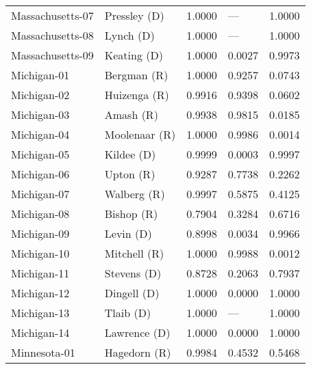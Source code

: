 \begin{longtable}{llrll}
  Massachusetts-07 &        {\color{Blue} Pressley (D)} &       1.0000 &           --- &        1.0000 \\
  Massachusetts-08 &           {\color{Blue} Lynch (D)} &       1.0000 &           --- &        1.0000 \\
  Massachusetts-09 &         {\color{Blue} Keating (D)} &       1.0000 &        0.0027 &        0.9973 \\
       Michigan-01 &          {\color{Red} Bergman (R)} &       1.0000 &        0.9257 &        0.0743 \\
       Michigan-02 &         {\color{Red} Huizenga (R)} &       0.9916 &        0.9398 &        0.0602 \\
       Michigan-03 &            {\color{Red} Amash (R)} &       0.9938 &        0.9815 &        0.0185 \\
       Michigan-04 &        {\color{Red} Moolenaar (R)} &       1.0000 &        0.9986 &        0.0014 \\
       Michigan-05 &          {\color{Blue} Kildee (D)} &       0.9999 &        0.0003 &        0.9997 \\
       Michigan-06 &            {\color{Red} Upton (R)} &       0.9287 &        0.7738 &        0.2262 \\
       Michigan-07 &          {\color{Red} Walberg (R)} &       0.9997 &        0.5875 &        0.4125 \\
       Michigan-08 &           {\color{Red} Bishop (R)} &       0.7904 &        0.3284 &        0.6716 \\
       Michigan-09 &           {\color{Blue} Levin (D)} &       0.8998 &        0.0034 &        0.9966 \\
       Michigan-10 &         {\color{Red} Mitchell (R)} &       1.0000 &        0.9988 &        0.0012 \\
       Michigan-11 &         {\color{Blue} Stevens (D)} &       0.8728 &        0.2063 &        0.7937 \\
       Michigan-12 &         {\color{Blue} Dingell (D)} &       1.0000 &        0.0000 &        1.0000 \\
       Michigan-13 &           {\color{Blue} Tlaib (D)} &       1.0000 &           --- &        1.0000 \\
       Michigan-14 &        {\color{Blue} Lawrence (D)} &       1.0000 &        0.0000 &        1.0000 \\
      Minnesota-01 &         {\color{Red} Hagedorn (R)} &       0.9984 &        0.4532 &        0.5468 \\

\end{longtable}
